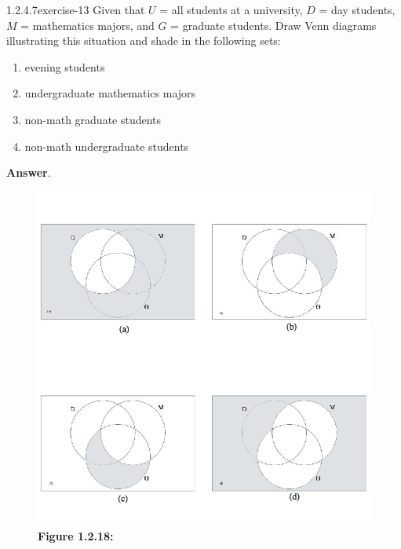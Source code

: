 \documentclass[twoside,10pt,]{book}
\numberwithin{equation}{section}
\begin{document}
\begin{divisionsolution}{1.2.4.7}{}{exercise-13}%
\hypertarget{p-325}{}%
Given that \(U\) = all students at a university, \(D\) = day students, \(M\) = mathematics majors, and \(G\) = graduate students. Draw Venn diagrams illustrating this situation and shade in the following sets:%
\par
\hypertarget{p-326}{}%
\leavevmode%
\begin{multicols}{2}
\begin{enumerate}[label=(\alph*)]
\item\hypertarget{li-255}{}\hypertarget{p-327}{}%
evening students%
\item\hypertarget{li-256}{}\hypertarget{p-328}{}%
undergraduate mathematics majors%
\item\hypertarget{li-257}{}\hypertarget{p-329}{}%
non-math graduate students%
\item\hypertarget{li-258}{}\hypertarget{p-330}{}%
non-math undergraduate students%
\end{enumerate}
\end{multicols}
%
\par\smallskip%
\noindent\textbf{Answer}.\quad%
\leavevmode%
\begin{figure}
\centering
\includegraphics[width=1\linewidth]{images/fig-sol-1-2-7.png}
\caption*{\textbf{Figure 1.2.18:} }
\end{figure}
\end{divisionsolution}%
\end{document}
